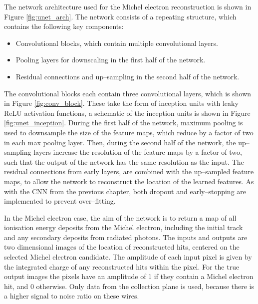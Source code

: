 The network architecture used for the Michel electron reconstruction is shown in
Figure \ref{fig:unet_arch}. The network consists of a repeating structure, which
contains the following key components:
\begin{itemize}
	\item Convolutional blocks, which contain multiple convolutional layers.
	\item Pooling layers for downscaling in the first half of the network.
	\item Residual connections and up--sampling in the second half of the network.
\end{itemize}
The convolutional blocks each contain three convolutional layers, which is
shown in Figure \ref{fig:conv_block}. These take the form of inception
units\cite{Szegedy2015} with leaky ReLU activation functions, a schematic of
the inception units is shown in Figure \ref{fig:unet_inception}. During the
first half of the network, maximum pooling is used to downsample the size of
the feature maps, which reduce by a factor of two in each max pooling layer.
Then, during the second half of the network, the up--sampling layers increase
the resolution of the feature maps by a factor of two, such that the output of
the network has the same resolution as the input. The residual connections
from early layers, are combined with the up--sampled feature maps, to allow
the network to reconstruct the location of the learned features. As with the
CNN from the previous chapter, both dropout and early--stopping are
implemented to prevent over--fitting.

In the Michel electron case, the aim of the network is to return a map of all
ionisation energy deposits from the Michel electron, including the initial
track and any secondary deposits from radiated photons. The inputs and outputs
are two dimensional images of the location of reconstructed hits, centered on
the selected Michel electron candidate. The amplitude of each input pixel is
given by the integrated charge of any reconstructed hits within the pixel. For
the true output images the pixels have an amplitude of 1 if they contain a
Michel electron hit, and 0 otherwise. Only data from the collection plane is
used, because there is a higher signal to noise ratio on these wires.

